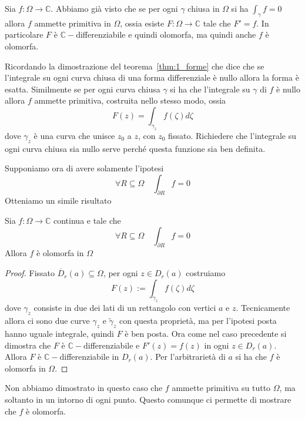 Sia \(f : \Omega \to \mathbb{C}\). Abbiamo già visto che se per ogni \(\gamma\)
chiusa in \(\Omega\) si ha \(\int_{\gamma} f = 0\) allora \(f\) ammette
primitiva in \(\Omega\), ossia esiste \(F : \Omega \to \mathbb{C}\) tale che
\(F' = f\). In particolare \(F\) è \(\mathbb{C}-\)differenziabile e quindi
olomorfa, ma quindi anche \(f\) è olomorfa.

Ricordando la dimostrazione del teorema~\ref{thm:1_forme} che dice che se
l'integrale su ogni curva chiusa di una forma differenziale è nullo allora la
forma è esatta. Similmente se per ogni curva chiusa \(\gamma\) si ha che
l'integrale su \(\gamma\) di \(f\) è nullo allora \(f\) ammette primitiva,
costruita nello stesso modo, ossia
\[
    F{(z)} = \int_{\gamma_z} f(\zeta) d\zeta
\]
dove \(\gamma_z\) è una curva che unisce \(z_{0}\) a \(z\), con \(z_{0}\)
fissato. Richiedere che l'integrale su ogni curva chiusa sia nullo serve perché
questa funzione sia ben definita.

Supponiamo ora di avere solamente l'ipotesi
\[
    \forall R \subseteq \Omega \quad \int_{\partial R} f = 0
\]
Otteniamo un simile risultato
\begin{theorem}[Morera]
    Sia \(f : \Omega \to \mathbb{C}\) continua e tale che
\[
    \forall R \subseteq \Omega \quad \int_{\partial R} f = 0
\]
Allora \(f\) è olomorfa in \(\Omega\)
\end{theorem}
\begin{proof}
Fissato \(\overline{D}_r{(a)} \subseteq \Omega \), per ogni \(z \in
D_r{(a)}\) costruiamo
\[
    F{(z)} := \int_{\gamma_z} f(\zeta) d\zeta
\]
dove \(\gamma_z\) consiste in due dei lati di un rettangolo con vertici \(a\) e
\(z\). Tecnicamente allora ci sono due curve \(\gamma_z\) e \(\tilde{\gamma}_z\)
con questa proprietà, ma per l'ipotesi posta hanno uguale integrale, quindi
\(F\) è ben posta. Ora come nel caso precedente si dimostra che \(F\) è
\(\mathbb{C}-\)differenziabile e \(F'{(z)} = f{(z)}\) in ogni \(z \in
D_r{(a)}\). Allora \(F\) è \(\mathbb{C}-\)differenziabile in \(D_r{(a)}\). Per
l'arbitrarietà di \(a\) si ha che \(f\) è olomorfa in \(\Omega\).
\end{proof}
\begin{remark}
    Non abbiamo dimostrato in questo caso che \(f\) ammette primitiva su tutto
    \(\Omega\), ma soltanto in un intorno di ogni punto. Questo comunque ci
    permette di mostrare che \(f\) è olomorfa.
\end{remark}


